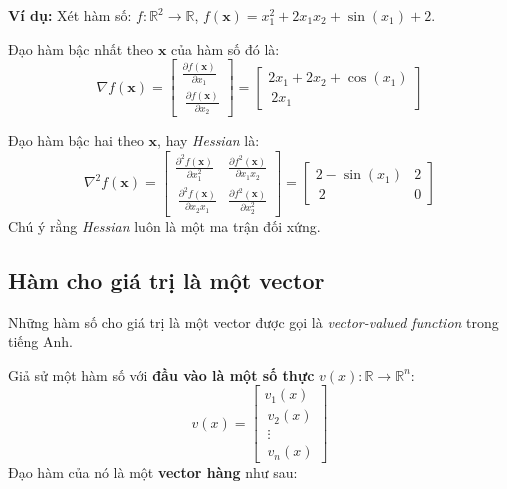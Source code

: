 \documentclass[12pt]{article}
\begin{document}
\textbf{Ví dụ:} Xét hàm số: $f: \mathbb{R}^2 \rightarrow \mathbb{R}$, $f(\mathbf{x}) = x_1 ^2 + 2x_1x_2 + \sin(x_1) + 2$.  
 
Đạo hàm bậc nhất theo $\mathbf{x}$ của hàm số đó là:  
\begin{equation*} 
\nabla f(\mathbf{x}) = 
\left[ 
\begin{matrix} 
    \frac{\partial f(\mathbf{x})}{\partial x_1} \\\ 
    \frac{\partial f(\mathbf{x})}{\partial x_2} 
\end{matrix} 
\right] = \left[ 
\begin{matrix} 
    2x_1 + 2x_2 + \cos(x_1) \\\ 
    2x_1 
\end{matrix} 
\right] 
\end{equation*} 
 
Đạo hàm bậc hai theo $\mathbf{x}$, hay \textit{Hessian} là:  
\begin{equation*} 
\nabla^2 f(\mathbf{x}) =  
\left[ 
\begin{matrix} 
    \frac{\partial^2 f(\mathbf{x})}{\partial x_1^2} & \frac{\partial f^2(\mathbf{x})}{\partial x_1x_2} \\\ 
    \frac{\partial^2 f(\mathbf{x})}{\partial x_2x_1} & \frac{\partial f^2(\mathbf{x})}{\partial x_2^2} 
\end{matrix} 
\right] = 
\left[ 
\begin{matrix} 
    2 - \sin(x_1) & 2 \\\ 
    2 & 0  
\end{matrix} 
\right] 
\end{equation*} 
Chú ý rằng \textit{Hessian} luôn là một ma trận đối xứng.  
 
 
 
\subsection{Hàm cho giá trị là một vector }
 
Những hàm số cho giá trị là một vector được gọi là \textit{vector-valued function} trong tiếng Anh.  
 
Giả sử một hàm số với \textbf{đầu vào là một số thực} $v(x): \mathbb{R} \rightarrow \mathbb{R}^n $: 
\begin{equation} 
\label{eqn:vectorvalued}
v(x) =  
\left[ 
\begin{matrix} 
    v_1(x) \\\ 
    v_2(x) \\\ 
    \vdots \\\ 
    v_n(x) 
\end{matrix} 
\right] 
\end{equation} 
Đạo hàm của nó là một \textbf{vector hàng} như sau:  
\end{document}
